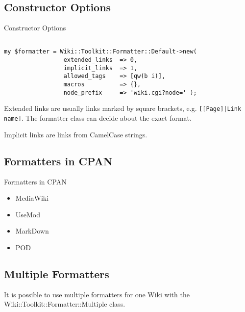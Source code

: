 \subsection{Constructor Options}


\begin{frame}[fragile]{Constructor Options}
\begin{lstlisting}

my $formatter = Wiki::Toolkit::Formatter::Default->new(
                 extended_links  => 0,
                 implicit_links  => 1,
                 allowed_tags    => [qw(b i)],
                 macros          => {},
                 node_prefix     => 'wiki.cgi?node=' );

\end{lstlisting}
\end{frame}

Extended links are usually links marked by square brackets, e.g.
\verb+[[Page]|Link name]+. The formatter class can decide about
the exact format.

Implicit links are links from CamelCase strings.



\subsection{Formatters in CPAN}

\begin{frame}{Formatters in CPAN}
 \begin{itemize}
  \item MediaWiki
  \item UseMod
  \item MarkDown
  \item POD
 \end{itemize}
\end{frame}

\subsection{Multiple Formatters}

It is possible to use multiple formatters for one Wiki with
the Wiki::Toolkit::Formatter::Multiple class.

